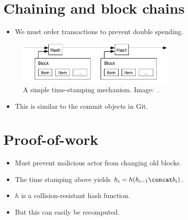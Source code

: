 \section[Chaining]{Chaining and block chains}

\begin{frame}
  \begin{remark}
    \begin{itemize}
      \item We must order transactions to prevent double spending.
    \end{itemize}
  \end{remark}
\end{frame}

\begin{frame}
  \begin{figure}
    \includegraphics[width=0.7\textwidth]{fig/bitcoin-stamp.png}
    \caption{A simple time-stamping mechanism.
    Image:~\cite{Nakamoto2008bap}.}
  \end{figure}

  \pause

  \begin{remark}
    \begin{itemize}
      \item This is similar to the commit objects in Git.
    \end{itemize}
  \end{remark}
\end{frame}


\section{Proof-of-work}

\begin{frame}
  \begin{remark}[Forgery]
    \begin{itemize}
      \item Must prevent malicious actor from changing old blocks.
      \item The time stamping above yields \(h_i = h(h_{i-1}\concat b_i)\).
      \item \(h\) is a collision-resistant hash function.
      \item But this can easily be recomputed.
    \end{itemize}
  \end{remark}
\end{frame}

